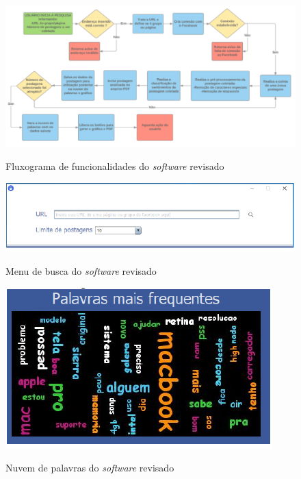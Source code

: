\begin{figure}[!h]
\centering 
\caption{Fluxograma de funcionalidades do \textit{software} revisado}
\includegraphics[scale=0.48,angle=270]{imagens/fluxofilipe.png}
\label{fig:fluxotccfilipe}
\end{figure}

\begin{figure}[!h]
\centering 
\caption{Menu de busca do \textit{software} revisado}
\includegraphics[scale=0.6]{imagens/menudebuscafilipe.png}
\label{fig:menutccfilipe}
\end{figure}

\begin{figure}[!h]
\centering 
\caption{Nuvem de palavras do \textit{software} revisado}
\includegraphics[scale=0.5]{imagens/nuvemdepalavras.png}
\label{fig:nuvemtccfilipe}
\end{figure}

